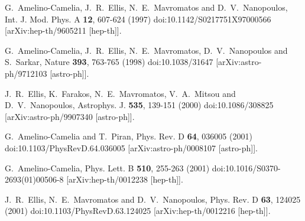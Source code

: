 \documentclass[jkps,preprint,fleqn]{revtex4} %
\begin{document}
\begin{thebibliography}{999}

G.~Amelino-Camelia, J.~R.~Ellis, N.~E.~Mavromatos and D.~V.~Nanopoulos,
Int. J. Mod. Phys. A \textbf{12}, 607-624 (1997)
doi:10.1142/S0217751X97000566
[arXiv:hep-th/9605211 [hep-th]].

G.~Amelino-Camelia, J.~R.~Ellis, N.~E.~Mavromatos, D.~V.~Nanopoulos and S.~Sarkar,
Nature \textbf{393}, 763-765 (1998)
doi:10.1038/31647
[arXiv:astro-ph/9712103 [astro-ph]].

J.~R.~Ellis, K.~Farakos, N.~E.~Mavromatos, V.~A.~Mitsou and D.~V.~Nanopoulos,
Astrophys. J. \textbf{535}, 139-151 (2000)
doi:10.1086/308825
[arXiv:astro-ph/9907340 [astro-ph]].

G.~Amelino-Camelia and T.~Piran,
Phys. Rev. D \textbf{64}, 036005 (2001)
doi:10.1103/PhysRevD.64.036005
[arXiv:astro-ph/0008107 [astro-ph]].

G.~Amelino-Camelia,
Phys. Lett. B \textbf{510}, 255-263 (2001)
doi:10.1016/S0370-2693(01)00506-8
[arXiv:hep-th/0012238 [hep-th]].

J.~R.~Ellis, N.~E.~Mavromatos and D.~V.~Nanopoulos,
Phys. Rev. D \textbf{63}, 124025 (2001)
doi:10.1103/PhysRevD.63.124025
[arXiv:hep-th/0012216 [hep-th]].


\end{thebibliography}
\end{document}
